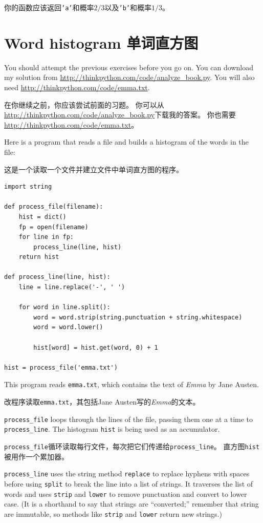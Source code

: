 \documentclass[10pt]{book}
\begin{document}
\begin{CJK}{UTF8}{gbsn}
\begin{exercise}
你的函数应该返回{\tt 'a'}和概率$2/3$以及{\tt 'b'}和概率$1/3$。

\end{exercise}


\section{Word histogram 单词直方图}

You should attempt the previous exercises before you go on.
You can download my solution from
 \url{http://thinkpython.com/code/analyze_book.py}.  You will
also need \url{http://thinkpython.com/code/emma.txt}.

在你继续之前，你应该尝试前面的习题。
你可以从\url{http://thinkpython.com/code/analyze_book.py}下载我的答案。
你也需要\url{http://thinkpython.com/code/emma.txt}。

Here is a program that reads a file and builds a histogram of the
words in the file:

这是一个读取一个文件并建立文件中单词直方图的程序。

\begin{verbatim}
import string

def process_file(filename):
    hist = dict()
    fp = open(filename)
    for line in fp:
        process_line(line, hist)
    return hist

def process_line(line, hist):
    line = line.replace('-', ' ')
    
    for word in line.split():
        word = word.strip(string.punctuation + string.whitespace)
        word = word.lower()

        hist[word] = hist.get(word, 0) + 1

hist = process_file('emma.txt')
\end{verbatim}
%
This program reads {\tt emma.txt}, which contains the text of {\em
  Emma} by Jane Austen.

改程序读取{\tt emma.txt}，其包括Jane Austen写的{\em Emma}的文本。

\verb"process_file" loops through the lines of the file,
passing them one at a time to \verb"process_line".  The histogram
{\tt hist} is being used as an accumulator.

\verb"process_file"循环读取每行文件，每次把它们传递给\verb"process_line"。
直方图{\tt hist}被用作一个累加器。

\verb"process_line" uses the string method {\tt replace} to replace
hyphens with spaces before using {\tt split} to break the line into a
list of strings.  It traverses the list of words and uses {\tt strip}
and {\tt lower} to remove punctuation and convert to lower case.  (It
is a shorthand to say that strings are ``converted;'' remember that
string are immutable, so methods like {\tt strip} and {\tt lower}
return new strings.)


\end{CJK}
\end{document}
